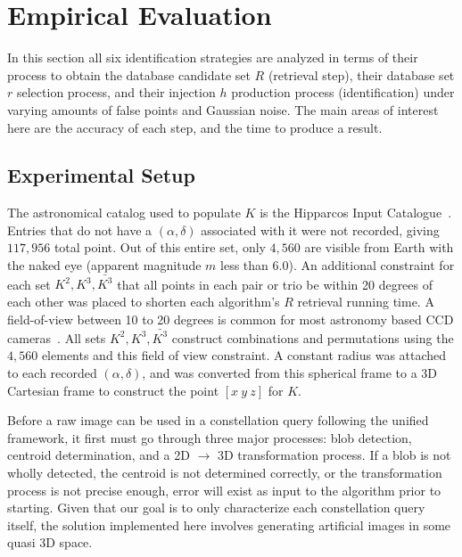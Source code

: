 \newcommand{\AVG}{\mathit{AVG}}

\section{Empirical Evaluation}\label{sec:empiricalEvaluation}
In this section all six identification strategies are analyzed in terms of their process to obtain the database
candidate set $R$ (retrieval step), their database set $r$ selection process, and their injection $h$ production process
(identification) under varying amounts of false points and Gaussian noise.
The main areas of interest here are the accuracy of each step, and the time to produce a result.


\subsection{Experimental Setup}\label{subsec:experimentalSetup}
The astronomical catalog used to populate $K$ is the Hipparcos Input Catalogue~\cite{perryman:hipparcosCatalogue}.
Entries that do not have a $\left( \alpha, \delta \right)$ associated with it were not recorded, giving $117{,}956$ total point.
Out of this entire set, only $4{,}560$ are visible from Earth with the naked eye (apparent magnitude $m$ less than 6.0).
An additional constraint for each set $K^2, K^3, \bar{K^3}$ that all points in each pair or trio be within 20
degrees of each other was placed to shorten each algorithm's $R$ retrieval running time.
A field-of-view between 10 to 20 degrees is common for most astronomy based CCD
cameras~\cite{mortari:pyramidIdentification}.
All sets $K^2, K^3, \bar{K^3}$ construct combinations and permutations using the $4{,}560$ elements and this field
of view constraint.
A constant radius was attached to each recorded $\left(\alpha, \delta \right)$, and was converted from this spherical
frame to a 3D Cartesian frame to construct the point $[ x \ y \ z ]$ for $K$.

Before a raw image can be used in a constellation query following the unified framework, it first must go through
three major processes: blob detection, centroid determination, and a 2D $\rightarrow$ 3D transformation process.
If a blob is not wholly detected, the centroid is not determined correctly, or the transformation process
is not precise enough, error will exist as input to the algorithm prior to starting.
Given that our goal is to only characterize each constellation query itself, the solution implemented here
involves generating artificial images in some quasi 3D space.

